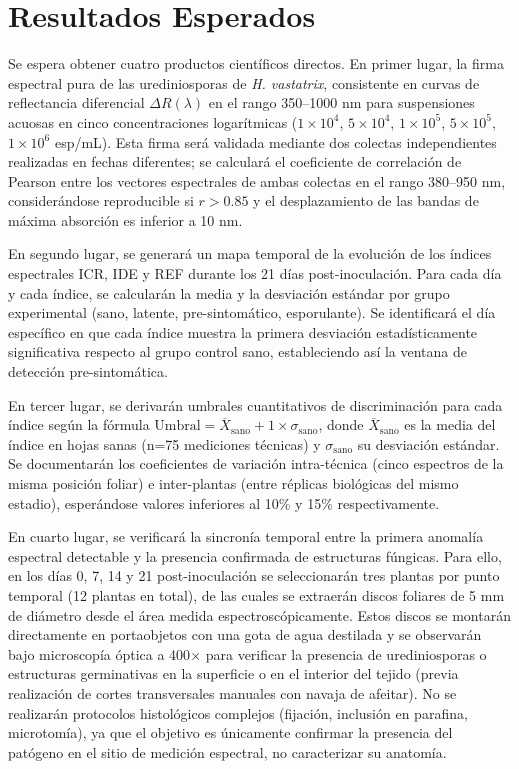 \documentclass[12pt, a4paper]{article}
\begin{document}
	
	\section{Resultados Esperados}
	
	Se espera obtener cuatro productos científicos directos. En primer lugar, la firma espectral pura de las urediniosporas de \textit{H. vastatrix}, consistente en curvas de reflectancia diferencial $\Delta R(\lambda)$ en el rango 350--1000 nm para suspensiones acuosas en cinco concentraciones logarítmicas ($1\times10^4$, $5\times10^4$, $1\times10^5$, $5\times10^5$, $1\times10^6$ esp/mL). Esta firma será validada mediante dos colectas independientes realizadas en fechas diferentes; se calculará el coeficiente de correlación de Pearson entre los vectores espectrales de ambas colectas en el rango 380--950 nm, considerándose reproducible si $r > 0.85$ y el desplazamiento de las bandas de máxima absorción es inferior a 10 nm.
	
	En segundo lugar, se generará un mapa temporal de la evolución de los índices espectrales ICR, IDE y REF durante los 21 días post-inoculación. Para cada día y cada índice, se calcularán la media y la desviación estándar por grupo experimental (sano, latente, pre-sintomático, esporulante). Se identificará el día específico en que cada índice muestra la primera desviación estadísticamente significativa respecto al grupo control sano, estableciendo así la ventana de detección pre-sintomática.
	
	En tercer lugar, se derivarán umbrales cuantitativos de discriminación para cada índice según la fórmula $\text{Umbral} = \overline{X}_{\text{sano}} + 1 \times \sigma_{\text{sano}}$, donde $\overline{X}_{\text{sano}}$ es la media del índice en hojas sanas (n=75 mediciones técnicas) y $\sigma_{\text{sano}}$ su desviación estándar. Se documentarán los coeficientes de variación intra-técnica (cinco espectros de la misma posición foliar) e inter-plantas (entre réplicas biológicas del mismo estadio), esperándose valores inferiores al 10\% y 15\% respectivamente.
	
	En cuarto lugar, se verificará la sincronía temporal entre la primera anomalía espectral detectable y la presencia confirmada de estructuras fúngicas. Para ello, en los días 0, 7, 14 y 21 post-inoculación se seleccionarán tres plantas por punto temporal (12 plantas en total), de las cuales se extraerán discos foliares de 5 mm de diámetro desde el área medida espectroscópicamente. Estos discos se montarán directamente en portaobjetos con una gota de agua destilada y se observarán bajo microscopía óptica a 400$\times$ para verificar la presencia de urediniosporas o estructuras germinativas en la superficie o en el interior del tejido (previa realización de cortes transversales manuales con navaja de afeitar). No se realizarán protocolos histológicos complejos (fijación, inclusión en parafina, microtomía), ya que el objetivo es únicamente confirmar la presencia del patógeno en el sitio de medición espectral, no caracterizar su anatomía.
	
\end{document}

